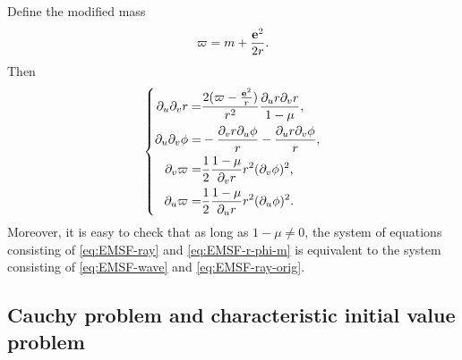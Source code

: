 \documentclass[10pt, reqno]{amsart}
\theoremstyle{definition}
\theoremstyle{remark}
\theoremstyle{conjecture}
\numberwithin{equation}{section}
\newcommand{\rd}{\partial}
\newcommand{\0}{\emptyset}
\newcommand{\bfe}{{\bf e}}
\newcommand{\e}{\bfe}							%
\begin{document}
Define the modified mass
\begin{equation*}
	\varpi = m + \frac{\e^{2}}{2 r}.
\end{equation*}
Then
\begin{equation} \label{eq:EMSF-r-phi-m}
\left\{
\begin{aligned}
\rd_{u} \rd_{v} r = & \frac{2(\varpi - \frac{\e^{2}}{r})}{r^{2}} \frac{\rd_{u} r \rd_{v} r}{1-\mu}, \\
\rd_{u} \rd_{v} \phi = & - \frac{\rd_{v} r \rd_{u} \phi}{r} - \frac{\rd_{u} r \rd_{v} \phi}{r}, \\
	\rd_{v} \varpi =& \frac{1}{2} \frac{1-\mu}{\rd_{v} r} r^{2} (\rd_{v} \phi)^{2}, \\
	\rd_{u} \varpi =& \frac{1}{2} \frac{1-\mu}{\rd_{u} r} r^{2} (\rd_{u} \phi)^{2}.
\end{aligned}
\right.
\end{equation}
Moreover, it is easy to check that as long as $1-\mu\neq 0$, the system of equations consisting of \eqref{eq:EMSF-ray} and \eqref{eq:EMSF-r-phi-m} is equivalent to the system consisting of \eqref{eq:EMSF-wave} and \eqref{eq:EMSF-ray-orig}.



\subsection{Cauchy problem and characteristic initial value problem}\label{sec:Cauchy}
\end{document}
